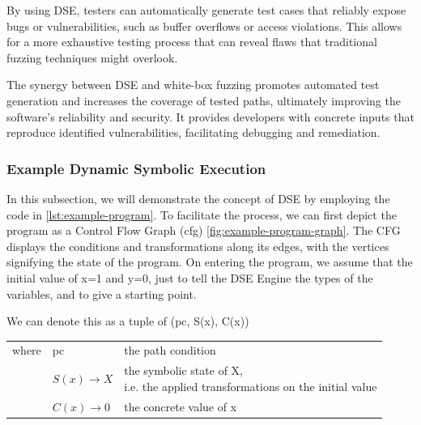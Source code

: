 By using DSE, testers can automatically generate test cases that reliably expose bugs or vulnerabilities, such as buffer overflows or access violations. This allows for a more exhaustive testing process that can reveal flaws that traditional fuzzing techniques might overlook.

The synergy between DSE and white-box fuzzing promotes automated test generation and increases the coverage of tested paths, ultimately improving the software's reliability and security. It provides developers with concrete inputs that reproduce identified vulnerabilities, facilitating debugging and remediation.



\subsubsection{Example Dynamic Symbolic Execution}
In this subsection, we will demonstrate the concept of DSE by employing the code in \autoref{lst:example-program}. 
To facilitate the process, we can first depict the program as a Control Flow Graph (\gls{cfg}) \autoref{fig:example-program-graph}. 
The CFG displays the conditions and transformations along its edges, with the vertices signifying the state of the program.
On entering  the program, we assume that the initial value of x=1 and y=0, just to tell the DSE Engine the types of the variables, and to give a starting point. 

\begin{center}
    We can denote this as a tuple of (pc, S(x), C(x)) 
    \begin{table}[h]
        \begin{tabular}{lll}
            where & pc & the path condition \\
             & $S(x) \rightarrow X$& \specialcell[c]{the symbolic state of X,\\ i.e. the applied transformations on the initial value}\\
             & $C(x) \rightarrow 0$& the concrete value of x\\
        \end{tabular}
    \end{table}
\end{center} 

\vspace{0.5cm}

